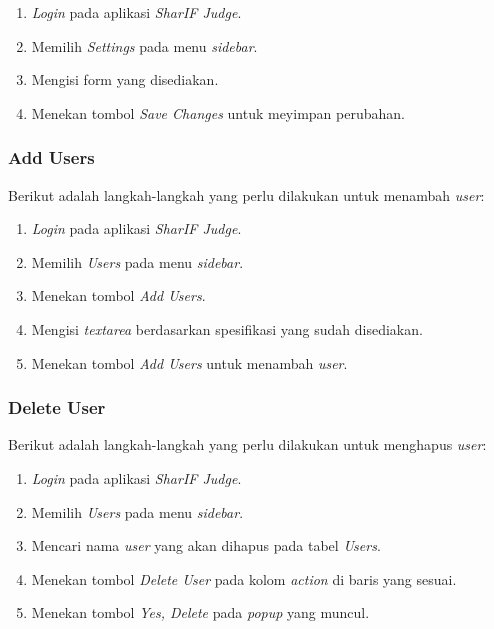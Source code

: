 \begin{enumerate}
	\item \textit{Login} pada aplikasi \textit{SharIF Judge}.
	\item Memilih \textit{Settings} pada menu \textit{sidebar}.
	\item Mengisi form yang disediakan.
	\item Menekan tombol \textit{Save Changes} untuk meyimpan perubahan.
\end{enumerate}

\subsubsection{Add Users}
\label{subsubsec:skenario_add_users}
Berikut adalah langkah-langkah yang perlu dilakukan untuk menambah \textit{user}:

\begin{enumerate}
	\item \textit{Login} pada aplikasi \textit{SharIF Judge}.
	\item Memilih \textit{Users} pada menu \textit{sidebar}.
	\item Menekan tombol \textit{Add Users}.
	\item Mengisi \textit{textarea} berdasarkan spesifikasi yang sudah disediakan.
	\item Menekan tombol \textit{Add Users} untuk menambah \textit{user}.
\end{enumerate}

\subsubsection{Delete User}
\label{subsubsec:skenario_delete_user}
Berikut adalah langkah-langkah yang perlu dilakukan untuk menghapus \textit{user}:

\begin{enumerate}
	\item \textit{Login} pada aplikasi \textit{SharIF Judge}.
	\item Memilih \textit{Users} pada menu \textit{sidebar}.
	\item Mencari nama \textit{user} yang akan dihapus pada tabel \textit{Users}.
	\item Menekan tombol \textit{Delete User} pada kolom \textit{action} di baris yang sesuai.
	\item Menekan tombol \textit{Yes, Delete} pada \textit{popup} yang muncul.
\end{enumerate}

